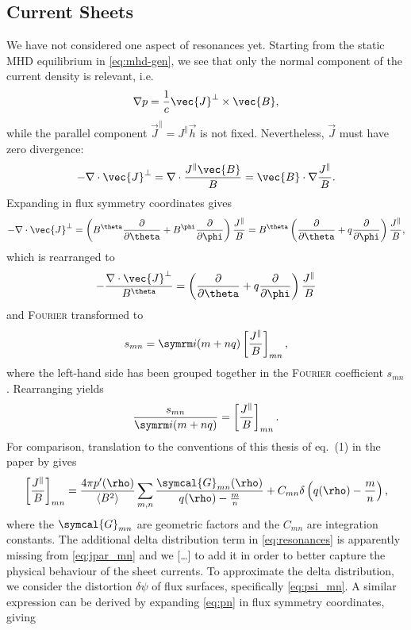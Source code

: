 \subsection{Current Sheets}
\label{sec:sheets}

We have not considered one aspect of resonances yet. Starting from the static MHD equilibrium in \cref{eq:mhd-gen}, we see that only the normal component of the current density is relevant, i.e.
\begin{gather}
  \grad p = \frac{1}{c} \vec{J}^{\perp} \times \vec{B},
\end{gather}
while the parallel component $\vec{J}^{\parallel} = J^{\parallel} \vec{h}$ is not fixed. Nevertheless, $\vec{J}$ must have zero divergence:
\begin{gather}
  -\divg \vec{J}^{\perp} = \divg \frac{J^{\parallel} \vec{B}}{B} = \vec{B} \cdot \grad \frac{J^{\parallel}}{B}.
\end{gather}
Expanding in flux symmetry coordinates gives
\begin{gather}
  -\divg \vec{J}^{\perp} = \left ( B^{\theta} \pd{\theta} + B^{\phi} \pd{\phi} \right ) \frac{J^{\parallel}}{B} = B^{\theta} \left ( \pd{\theta} + q \pd{\phi} \right ) \frac{J^{\parallel}}{B},
\end{gather}
which is rearranged to
\begin{gather}
  -\frac{\divg \vec{J}^{\perp}}{B^{\theta}} = \left ( \pd{\theta} + q \pd{\phi} \right ) \frac{J^{\parallel}}{B}
\end{gather}
and \textsc{Fourier} transformed to
\begin{gather}
  s_{m n} = \im (m + n q) \left [ \frac{J^{\parallel}}{B} \right ]_{m n},
\end{gather}
where the left-hand side has been grouped together in the \textsc{Fourier} coefficient \ensuremath{s_{m n}}. Rearranging yields
\begin{gather}
  \frac{s_{m n}}{\im (m + n q)} = \left [ \frac{J^{\parallel}}{B} \right ]_{m n}. \label{eq:jpar_mn}
\end{gather}
For comparison, translation to the conventions of this thesis of eq.~(1) in the paper by \textcite{Waelbroeck09} gives
\begin{gather}
  \left [ \frac{J^{\parallel}}{B} \right ]_{m n} = \frac{4 \pi p'(\rho)}{\langle B^{2} \rangle} \sum_{m, n} \frac{\symcal{G}_{m n} (\rho)}{q(\rho) - \frac{m}{n}} + C_{m n} \delta \left ( q(\rho) - \frac{m}{n} \right ), \label{eq:resonances}
\end{gather}
where the $\symcal{G}_{m n}$ are geometric factors and the $C_{m n}$ are integration constants. The additional delta distribution term in \cref{eq:resonances} is apparently missing from \cref{eq:jpar_mn} and we [\ldots] to add it in order to better capture the physical behaviour of the sheet currents. To approximate the delta distribution, we consider the distortion $\delta \psi$ of flux surfaces, specifically \cref{eq:psi_mn}. A similar expression can be derived by expanding \cref{eq:pn} in flux symmetry coordinates, giving
